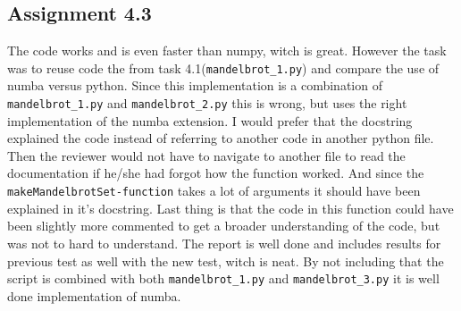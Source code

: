 \documentclass[a4paper]{article}
\begin{document}
\subsection*{Assignment 4.3}
The code works and is even faster than numpy, witch is great. However the task was to reuse code the from task 4.1(\texttt{mandelbrot\_1.py}) and compare the use of numba versus python. Since this implementation is a combination of \texttt{mandelbrot\_1.py} and \texttt{mandelbrot\_2.py} this is wrong, but uses the right implementation of the numba extension.
\newline\newline
I would prefer that the docstring explained the code instead of referring to another code in another python file. Then the reviewer would not have to navigate to another file to read the documentation if he/she had forgot how the function worked. And since the \texttt{makeMandelbrotSet-function} takes a lot of arguments it should have been explained in it's docstring. Last thing is that the code in this function could have been slightly more commented to get a broader understanding of the code, but was not to hard to understand.
\newline\newline
The report is well done and includes results for previous test as well with the new test, witch is neat.
\newline\newline
By not including that the script is combined with both \texttt{mandelbrot\_1.py} and \texttt{mandelbrot\_3.py} it is well done implementation of numba.


\end{document}
